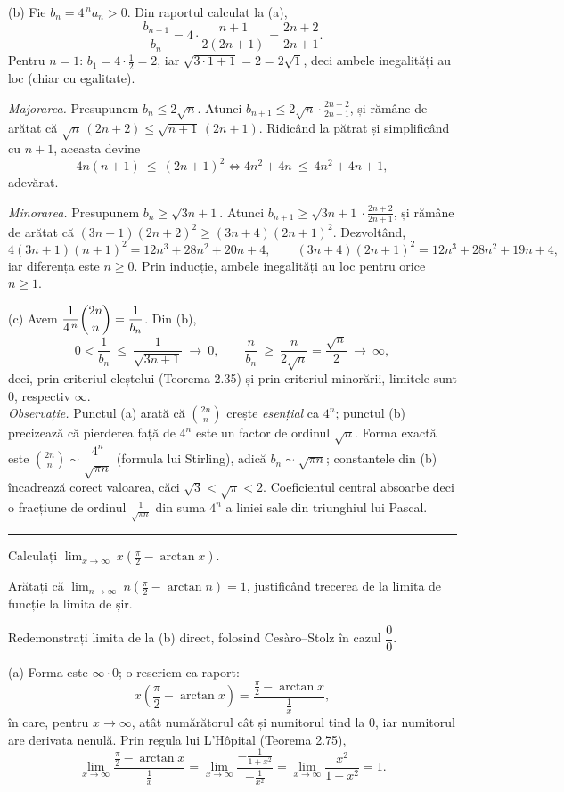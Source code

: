 (b) Fie $b_n=4^{\,n}a_n>0$. Din raportul calculat la (a),
\[ \frac{b_{n+1}}{b_n}=4\cdot\frac{n+1}{2(2n+1)}=\frac{2n+2}{2n+1} . \]
Pentru $n=1$: $b_1=4\cdot\frac12=2$, iar $\sqrt{3\cdot1+1}=2=2\sqrt1$, deci ambele inegalități au loc (chiar cu egalitate).

\emph{Majorarea.} Presupunem $b_n\le2\sqrt n$. Atunci $b_{n+1}\le2\sqrt n\cdot\frac{2n+2}{2n+1}$, și rămâne de arătat că $\sqrt n\,(2n+2)\le\sqrt{n+1}\,(2n+1)$. Ridicând la pătrat și simplificând cu $n+1$, aceasta devine
\[ 4n(n+1)\ \le\ (2n+1)^{2}\iff 4n^{2}+4n\ \le\ 4n^{2}+4n+1 , \]
adevărat.

\emph{Minorarea.} Presupunem $b_n\ge\sqrt{3n+1}$. Atunci $b_{n+1}\ge\sqrt{3n+1}\cdot\frac{2n+2}{2n+1}$, și rămâne de arătat că $(3n+1)(2n+2)^{2}\ge(3n+4)(2n+1)^{2}$. Dezvoltând,
\[ 4(3n+1)(n+1)^{2}=12n^{3}+28n^{2}+20n+4,\qquad (3n+4)(2n+1)^{2}=12n^{3}+28n^{2}+19n+4 , \]
iar diferența este $n\ge0$. Prin inducție, ambele inegalități au loc pentru orice $n\ge1$.

(c) Avem $\dfrac{1}{4^{\,n}}\dbinom{2n}{n}=\dfrac1{b_n}$. Din (b),
\[ 0<\frac1{b_n}\ \le\ \frac1{\sqrt{3n+1}}\ \longrightarrow\ 0,\qquad \frac{n}{b_n}\ \ge\ \frac{n}{2\sqrt n}=\frac{\sqrt n}{2}\ \longrightarrow\ \infty , \]
deci, prin criteriul cleștelui (Teorema 2.35) și prin criteriul minorării, limitele sunt $0$, respectiv $\infty$.\\[2pt]
\emph{Observație.} Punctul (a) arată că $\binom{2n}{n}$ crește \emph{esențial} ca $4^{n}$; punctul (b) precizează că pierderea față de $4^{n}$ este un factor de ordinul $\sqrt n$. Forma exactă este $\binom{2n}{n}\sim\dfrac{4^{n}}{\sqrt{\pi n}}$ (formula lui Stirling), adică $b_n\sim\sqrt{\pi n}$; constantele din (b) încadrează corect valoarea, căci $\sqrt3<\sqrt\pi<2$. Coeficientul central absoarbe deci o fracțiune de ordinul $\frac1{\sqrt{\pi n}}$ din suma $4^{n}$ a liniei sale din triunghiul lui Pascal.
\vspace{1mm}\hrule

\begin{parti}
  \item Calculați $\displaystyle\lim_{x\to\infty}\ x\left(\frac{\pi}{2}-\arctan x\right)$.
  \item Arătați că $\displaystyle\lim_{n\to\infty}\ n\left(\frac{\pi}{2}-\arctan n\right)=1$, justificând trecerea de la limita de funcție la limita de șir.
  \item Redemonstrați limita de la (b) direct, folosind Cesàro--Stolz în cazul $\dfrac00$.
\end{parti}
\sol (a) Forma este $\infty\cdot0$; o rescriem ca raport:
\[ x\left(\frac\pi2-\arctan x\right)=\frac{\frac\pi2-\arctan x}{\frac1x} , \]
în care, pentru $x\to\infty$, atât numărătorul cât și numitorul tind la $0$, iar numitorul are derivata nenulă. Prin regula lui L'Hôpital (Teorema 2.75),
\[ \lim_{x\to\infty}\frac{\frac\pi2-\arctan x}{\frac1x}=\lim_{x\to\infty}\frac{-\frac{1}{1+x^{2}}}{-\frac{1}{x^{2}}}=\lim_{x\to\infty}\frac{x^{2}}{1+x^{2}}=1 . \]

